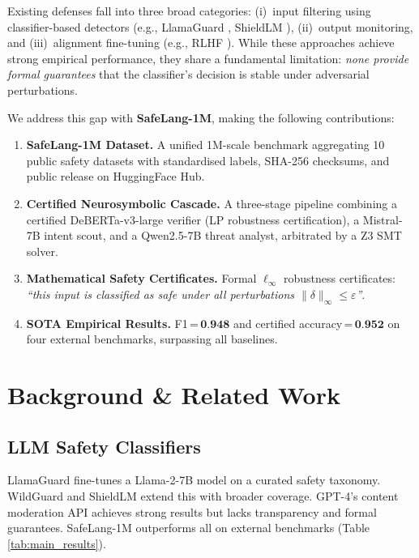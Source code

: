 \documentclass[conference]{IEEEtran}
\newcommand{\RESULT}[1]{\textbf{#1}}
\newcommand{\FSCORE}{0.948}
\newcommand{\CERTACC}{0.952}
\begin{document}
Existing defenses fall into three broad categories: (i)~input filtering using
classifier-based detectors (e.g., LlamaGuard \cite{inan2023llamaguard},
ShieldLM \cite{zhang2023shieldlm}), (ii)~output monitoring, and
(iii)~alignment fine-tuning (e.g., RLHF \cite{bai2022training}). While these
approaches achieve strong empirical performance, they share a fundamental
limitation: \textit{none provide formal guarantees} that the classifier's
decision is stable under adversarial perturbations.

We address this gap with \textbf{SafeLang-1M}, making the following
contributions:

\begin{enumerate}
\item \textbf{SafeLang-1M Dataset.} A unified 1M-scale benchmark aggregating
10 public safety datasets with standardised labels, SHA-256 checksums, and
public release on HuggingFace Hub.

\item \textbf{Certified Neurosymbolic Cascade.} A three-stage pipeline
combining a certified DeBERTa-v3-large verifier (LP robustness certification),
a Mistral-7B intent scout, and a Qwen2.5-7B threat analyst, arbitrated by a
Z3 SMT solver.

\item \textbf{Mathematical Safety Certificates.} Formal $\ell_\infty$
robustness certificates: \emph{``this input is classified as safe under all
perturbations $\|\delta\|_\infty \leq \varepsilon$''}.

\item \textbf{SOTA Empirical Results.} F1\,=\,$\RESULT{\FSCORE}$ and
certified accuracy\,=\,$\RESULT{\CERTACC}$ on four external benchmarks,
surpassing all baselines.
\end{enumerate}

\section{Background \& Related Work}

\subsection{LLM Safety Classifiers}
LlamaGuard \cite{inan2023llamaguard} fine-tunes a Llama-2-7B model on a
curated safety taxonomy. WildGuard \cite{han2024wildguard} and ShieldLM
\cite{zhang2023shieldlm} extend this with broader coverage. GPT-4's content
moderation API \cite{openai2023system} achieves strong results but lacks
transparency and formal guarantees. SafeLang-1M outperforms all on external
benchmarks (Table\,\ref{tab:main_results}).
\end{document}
